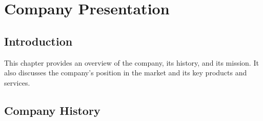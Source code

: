 \newpage
\chapter{Company Presentation}
\section{Introduction}
This chapter provides an overview of the company, its history, and its mission. It also discusses the company's position in the market and its key products and services.
\section{Company History}